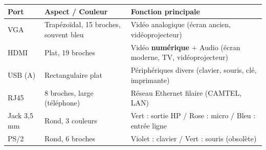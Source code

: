 \documentclass[11pt]{article}
\begin{document}
\begin{aretenir}
\begin{center}
\begin{tabularx}{\linewidth}{|l|X|l|}
\hline
\rowcolor{popblueL} \textbf{Port} & \textbf{Aspect / Couleur} & \textbf{Fonction principale} \\
\hline
VGA & Trapézoïdal, 15 broches, souvent bleu & Vidéo analogique (écran ancien, vidéoprojecteur) \\
\hline
HDMI & Plat, 19 broches & Vidéo \textbf{numérique} + Audio (écran moderne, TV, vidéoprojecteur) \\
\hline
USB (A) & Rectangulaire plat & Périphériques divers (clavier, souris, clé, imprimante) \\
\hline
RJ45 & 8 broches, large (téléphone) & Réseau Ethernet filaire (CAMTEL, LAN) \\
\hline
Jack 3,5 mm & Rond, 3 couleurs & Vert : sortie HP / Rose : micro / Bleu : entrée ligne \\
\hline
PS/2 & Rond, 6 broches & Violet : clavier / Vert : souris (obsolète) \\
\hline
\end{tabularx}
\end{center}
\end{aretenir}
\end{document}
